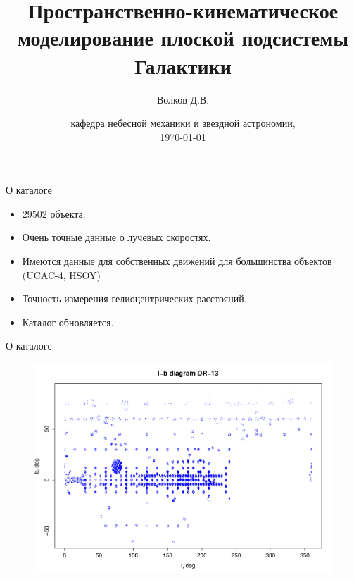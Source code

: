 \documentclass{beamer}
\begin{document}
\title{Пространственно-кинематическое моделирование плоской подсистемы Галактики}  
\author{Волков Д.В.}
\date{кафедра небесной механики и звездной астрономии, \\ \today} 
\frame{\titlepage} 

\begin{frame}{О каталоге}
	\begin{itemize}
		\item 29502 объекта.
		\item Очень точные данные о лучевых скоростях.	
                \item Имеются данные для собственных движений для большинства объектов (UCAC-4, HSOY)
		\item Точность измерения гелиоцентрических расстояний.
		\item Каталог обновляется.
	\end{itemize}
\end{frame}

\begin{frame}{О каталоге}
	\begin{center}
	\begin{figure}[h]
\begin{minipage}[h]{0.8\linewidth}
\includegraphics[width=1\linewidth]{pdf/lb_dr13.pdf}
\end{minipage}
\end{figure}
	\end{center}
\end{frame}
\end{document}
